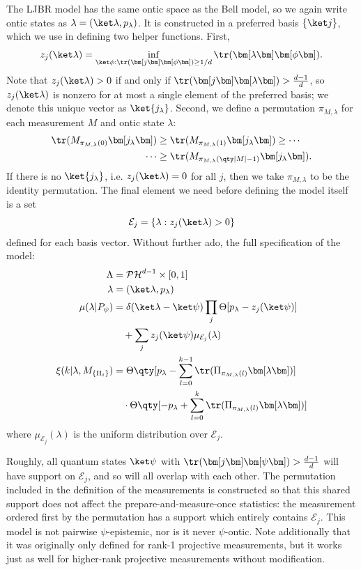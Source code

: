 \documentclass[%
 reprint,
superscriptaddress,
nofootinbib,
 amsmath,amssymb,
 prx, 
 accepted=2019-09-27,
]{quantumarticle}
\newcommand{\proj}[1]{{\bm[}#1{\bm]}}
\begin{document}
The LJBR model has the same ontic space as the Bell model, so we again
write ontic states as $\lambda=(\ket\lambda,p_\lambda)$. It is
constructed in a preferred basis $\{\ket j\}$, which we use in
defining two helper functions. First,
\begin{equation}
  \label{eq:17}
  z_j(\ket\lambda) = \inf_{\ket\phi:\tr(\proj j\proj\phi)\geq 1/d} \tr(\proj\lambda\proj\phi).
\end{equation}
Note that $z_j(\ket\lambda)>0$ if and only if
$\tr(\proj j\proj\lambda)>\frac{d-1}{d}$, so $z_j(\ket\lambda)$ is
nonzero for at most a single element of the preferred basis; we denote
this unique vector as $\ket{j_\lambda}$. Second, we define a
permutation $\pi_{M,\lambda}$ for each measurement $M$ and ontic state
$\lambda$:
\begin{align}
  \label{eq:28}
  \tr(M_{\pi_{M,\lambda}(0)}\proj{j_\lambda})&\geq \tr(M_{\pi_{M,\lambda}(1)}\proj{j_\lambda})\geq\cdots\nonumber\\
  \cdots&\geq \tr(M_{\pi_{M,\lambda}(\qty|M|-1)}\proj{j_\lambda}).
\end{align}
If there is no $\ket{j_\lambda}$, i.e. $z_j(\ket\lambda)=0$ for all
$j$, then we take $\pi_{M,\lambda}$ to be the identity
permutation. The final element we need before defining the model
itself is a set
\begin{equation}
  \label{eq:31}
  \mathcal E_j = \{\lambda:  z_j(\ket\lambda) > 0\}
\end{equation}
defined for each basis vector. Without further ado, the full
specification of the model:
\begin{align}
  \Lambda&= \mathcal{PH}^{d-1}\times[0,1]\nonumber\\
  \lambda&= (\ket\lambda,p_\lambda)\nonumber\\
  \mu(\lambda|P_\psi)&= \delta(\ket\lambda-\ket\psi)\prod_j\Theta[p_\lambda-z_j(\ket\psi)]\nonumber\\
  &\quad+ \sum_j z_j(\ket\psi)\mu_{\mathcal E_j}(\lambda) \nonumber\\
  \xi(k|\lambda,M_{\{\Pi_i\}})&= \Theta\qty[p_\lambda-\sum_{l=0}^{k-1}\tr(\Pi_{\pi_{M,\lambda}(l)}\proj\lambda)]\nonumber\\
  &\quad\cdot\Theta\qty[-p_\lambda+\sum_{l=0}^{k}\tr(\Pi_{\pi_{M,\lambda}(l)}\proj\lambda)]  
\end{align}
where $\mu_{\mathcal E_j}(\lambda)$ is the uniform distribution over
$\mathcal E_j$.

Roughly, all quantum states $\ket\psi$ with
$\tr(\proj j\proj \psi)>\frac{d-1}{d}$ will have support on
$\mathcal E_j$, and so will all overlap with each other. The
permutation included in the definition of the measurements is
constructed so that this shared support does not affect the
prepare-and-measure-once statistics: the measurement ordered first by
the permutation has a support which entirely contains $\mathcal
E_j$. This model is not pairwise $\psi$-epistemic, nor is it never
$\psi$-ontic. Note additionally that it was originally only defined
for rank-1 projective measurements, but it works just as well for
higher-rank projective measurements without modification.
\end{document}
